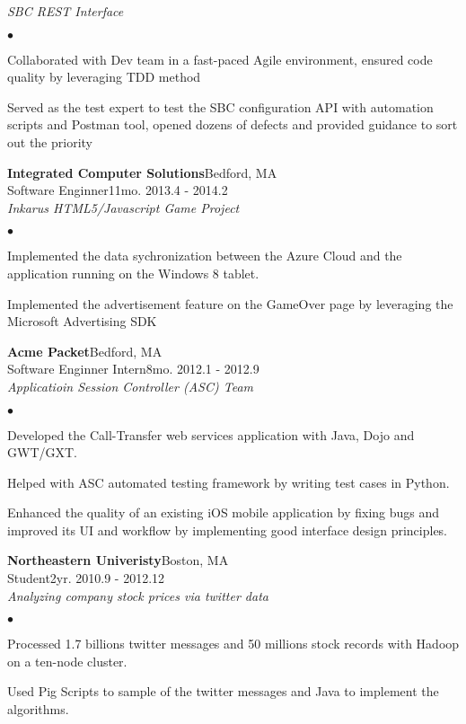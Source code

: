 \documentclass[10pt]{article}
\newcommand{\company}[5]{
    \large{\textbf{#1}}\hfill \small{#3}\\
    #2\hfill \small{#4}\small{#5}\\
}
\newcommand{\project}[1]{\checkmark\normalsize{{\emph{#1}}}\\}
\newenvironment{achievements}
    {\begin{list}
        {$\bullet$}{\topsep 0pt \itemsep -1pt}} 
    {\end{list}}
\begin{document}
  \project{SBC REST Interface}
  \begin{achievements}
\item Collaborated with Dev team in a fast-paced Agile environment, ensured code quality by leveraging TDD method
\item Served as the test expert to test the SBC configuration API with automation scripts and Postman tool, opened dozens of defects and provided guidance to sort out the priority
  \end{achievements}

  \company{Integrated Computer Solutions}{Software Enginner}{Bedford, MA}{11mo. }{2013.4 - 2014.2}

    \project{Inkarus HTML5/Javascript Game Project}
  \begin{achievements}
\item Implemented the data sychronization between the Azure Cloud and the application running on the Windows 8 tablet.
\item Implemented the advertisement feature on the GameOver page by leveraging the Microsoft Advertising SDK
  \end{achievements}

\vspace*{10pt}
  \company{Acme Packet}{Software Enginner Intern}{Bedford, MA}{8mo. }{2012.1 - 2012.9}

  \project{Applicatioin Session Controller (ASC) Team}
  \begin{achievements}
\item Developed the Call-Transfer web services application with Java, Dojo and GWT/GXT.
\item Helped with ASC automated testing framework by writing test cases in Python.
\item Enhanced the quality of an existing iOS mobile application by fixing bugs and improved its UI and workflow by implementing good interface design principles.
  \end{achievements}

\vspace*{10pt}
  \company{Northeastern Univeristy}{Student}{Boston, MA}{2yr. }{2010.9 - 2012.12}

  \project{Analyzing company stock prices via twitter data}
  \begin{achievements}
\item Processed 1.7 billions twitter messages and 50 millions stock records with Hadoop on a ten-node cluster.
\item Used Pig Scripts to sample of the twitter messages and Java to implement the algorithms.
  \end{achievements}
\end{document}

